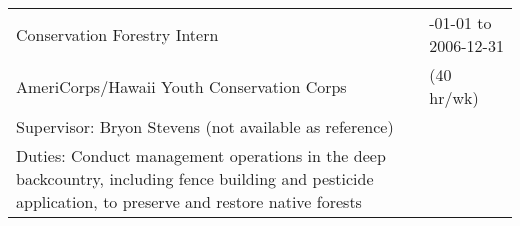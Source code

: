\documentclass[10pt,english]{article}
\providecommand{\tabularnewline}{\\}
\begin{document}
\begin{tabularx}{\textwidth}{@{}>{\raggedright}p{4.5in} >{\raggedleft}X@{}}
Conservation Forestry Intern & 2006-01-01 to 2006-12-31 \tabularnewline
\addtolength{\leftskip}{5ex} AmeriCorps/Hawaii Youth Conservation Corps & (40 hr/wk) \tabularnewline
\addtolength{\leftskip}{5ex}Supervisor: Bryon Stevens (not available as reference) & \tabularnewline
\addtolength{\leftskip}{5ex}Duties: Conduct management operations in the deep backcountry, including fence building and pesticide application, to preserve and restore native forests & \tabularnewline

\end{tabularx}

\vspace{1ex}

%
%


%
%
%
%
\end{document}
